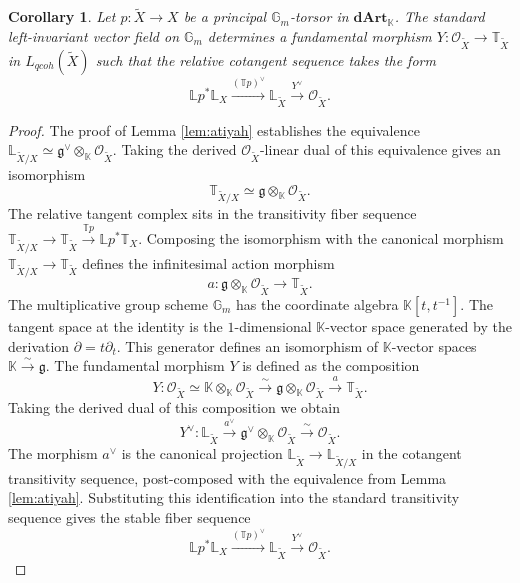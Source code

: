 \documentclass[10pt,a4paper]{amsart}
\newtheorem{corollary}{Corollary}
\newcommand{\Gm}{\mathbb{G}_m}
\newcommand{\K}{\mathbb{K}}
\newcommand{\LL}{\mathbb{L}}
\newcommand{\TT}{\mathbb{T}}
\newcommand{\cO}{\mathcal{O}}
\newcommand{\dArt}{\mathbf{dArt}}
\begin{document}
\begin{corollary} \label{cor:fundamental_morphism}
  Let $p \colon \widetilde{X} \to X$ be a principal $\Gm$-torsor in $\dArt_\K$. The standard left-invariant vector field on $\Gm$ determines a fundamental morphism $Y \colon \cO_{\widetilde{X}} \to \TT_{\widetilde{X}}$ in $L_{qcoh}(\widetilde{X})$ such that the relative cotangent sequence takes the form
  \begin{equation*}
    \LL p^* \LL_X \xrightarrow{(\TT p)^\vee} \LL_{\widetilde{X}} \xrightarrow{Y^\vee} \cO_{\widetilde{X}}.
  \end{equation*}
\end{corollary}

\begin{proof}
  The proof of Lemma \ref{lem:atiyah} establishes the equivalence $\LL_{\widetilde{X}/X} \simeq \mathfrak{g}^\vee \otimes_\K \cO_{\widetilde{X}}$. Taking the derived $\cO_{\widetilde{X}}$-linear dual of this equivalence gives an isomorphism
  \begin{equation*}
    \TT_{\widetilde{X}/X} \simeq \mathfrak{g} \otimes_\K \cO_{\widetilde{X}}.
  \end{equation*}
  The relative tangent complex sits in the transitivity fiber sequence $\TT_{\widetilde{X}/X} \to \TT_{\widetilde{X}} \xrightarrow{\TT p} \LL p^* \TT_X$. Composing the isomorphism with the canonical morphism $\TT_{\widetilde{X}/X} \to \TT_{\widetilde{X}}$ defines the infinitesimal action morphism
  \begin{equation*}
    a \colon \mathfrak{g} \otimes_\K \cO_{\widetilde{X}} \to \TT_{\widetilde{X}}.
  \end{equation*}
  The multiplicative group scheme $\Gm$ has the coordinate algebra $\K[t, t^{-1}]$. The tangent space at the identity is the $1$-dimensional $\K$-vector space generated by the derivation $\partial = t \partial_t$. This generator defines an isomorphism of $\K$-vector spaces $\K \xrightarrow{\sim} \mathfrak{g}$. The fundamental morphism $Y$ is defined as the composition
  \begin{equation*}
    Y \colon \cO_{\widetilde{X}} \simeq \K \otimes_\K \cO_{\widetilde{X}} \xrightarrow{\sim} \mathfrak{g} \otimes_\K \cO_{\widetilde{X}} \xrightarrow{a} \TT_{\widetilde{X}}.
  \end{equation*}
  Taking the derived dual of this composition we obtain
  \begin{equation*}
    Y^\vee \colon \LL_{\widetilde{X}} \xrightarrow{a^\vee} \mathfrak{g}^\vee \otimes_\K \cO_{\widetilde{X}} \xrightarrow{\sim} \cO_{\widetilde{X}}.
  \end{equation*}
  The morphism $a^\vee$ is the canonical projection $\LL_{\widetilde{X}} \to \LL_{\widetilde{X}/X}$ in the cotangent transitivity sequence, post-composed with the equivalence from Lemma \ref{lem:atiyah}. Substituting this identification into the standard transitivity sequence gives the stable fiber sequence
  \begin{equation*}
    \LL p^* \LL_X \xrightarrow{(\TT p)^\vee} \LL_{\widetilde{X}} \xrightarrow{Y^\vee} \cO_{\widetilde{X}}.
  \end{equation*}
\end{proof}
\end{document}

